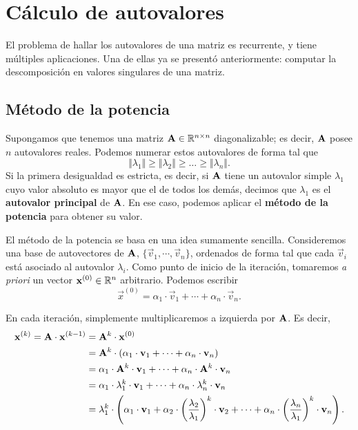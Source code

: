 
\section{Cálculo de autovalores}
\label{section:autovalores}

El problema de hallar los autovalores de una matriz es recurrente, y tiene
múltiples aplicaciones. Una de ellas ya se presentó anteriormente: computar
la descomposición en valores singulares de una matriz.

\subsection{Método de la potencia}

Supongamos que tenemos una matriz $\mathbf{A} \in \mathbb{R}^{n \times n}$
diagonalizable; es decir, $\mathbf{A}$ posee $n$ autovalores reales. Podemos
numerar estos autovalores de forma tal que
\[ \Vert \lambda_1 \Vert \geq \Vert \lambda_2 \Vert \geq \dots
    \geq \Vert \lambda_n \Vert. \]
Si la primera desigualdad es estricta, es decir, si $\mathbf{A}$ tiene un
autovalor simple $\lambda_1$ cuyo valor absoluto es mayor que el de todos los
demás, decimos que $\lambda_1$ es el \textbf{autovalor principal} de
$\mathbf{A}$. En ese caso, podemos aplicar el \textbf{método de la potencia} para
obtener su valor.

El método de la potencia se basa en una idea sumamente sencilla. Consideremos
una base de autovectores de $\mathbf{A}$, $\{\vec{v}_1, \cdots, \vec{v}_n\}$,
ordenados de forma tal que cada $\vec{v}_i$ está asociado al autovalor
$\lambda_i$.
Como punto de inicio de la iteración, tomaremos \emph{a priori} un vector
$\mathbf{x}^{(0)} \in \mathbb{R}^n$ arbitrario. Podemos escribir
\[ \vec{x}^{(0)} = \alpha_1 \cdot \vec{v}_1
    + \cdots + \alpha_n \cdot \vec{v}_n. \]

En cada iteración, simplemente multiplicaremos a izquierda por $\mathbf{A}$.
Es decir,
\[ \begin{aligned}
    \mathbf{x}^{(k)} = \mathbf{A} \cdot \mathbf{x}^{(k-1)}
        &= \mathbf{A}^k \cdot \mathbf{x}^{(0)} \\
        &= \mathbf{A}^k \cdot \left( \alpha_1 \cdot \mathbf{v}_1
            + \cdots + \alpha_n \cdot \mathbf{v}_n \right) \\
        &= \alpha_1 \cdot \mathbf{A}^k \cdot \mathbf{v}_1
            + \cdots + \alpha_n \cdot \mathbf{A}^k \cdot \mathbf{v}_n \\
        &= \alpha_1 \cdot \lambda_1^k \cdot \mathbf{v}_1
            + \cdots + \alpha_n \cdot \lambda_n^k \cdot \mathbf{v}_n \\
        &= \lambda_1^k \cdot \left( \alpha_1 \cdot \mathbf{v}_1
            + \alpha_2 \cdot
                \left(\frac{\lambda_2}{\lambda_1}\right)^k \cdot \mathbf{v}_2
            + \cdots + \alpha_n \cdot
                \left(\frac{\lambda_n}{\lambda_1}\right)^k \cdot \mathbf{v}_n
            \right).
\end{aligned} \]

